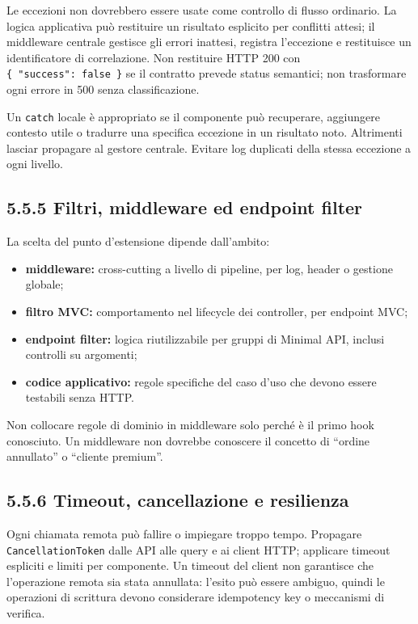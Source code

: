 \documentclass[
  italian,
  10pt,
]{book}
\providecommand{\tightlist}{%
  \setlength{\itemsep}{0pt}\setlength{\parskip}{0pt}}
\begin{document}
Le eccezioni non dovrebbero essere usate come controllo di flusso
ordinario. La logica applicativa può restituire un risultato esplicito
per conflitti attesi; il middleware centrale gestisce gli errori
inattesi, registra l'eccezione e restituisce un identificatore di
correlazione. Non restituire HTTP 200 con
\texttt{\{\ "success":\ false\ \}} se il contratto prevede status
semantici; non trasformare ogni errore in 500 senza classificazione.

Un \texttt{catch} locale è appropriato se il componente può recuperare,
aggiungere contesto utile o tradurre una specifica eccezione in un
risultato noto. Altrimenti lasciar propagare al gestore centrale.
Evitare log duplicati della stessa eccezione a ogni livello.

\subsection{5.5.5 Filtri, middleware ed endpoint
filter}\label{filtri-middleware-ed-endpoint-filter}

La scelta del punto d'estensione dipende dall'ambito:

\begin{itemize}
\tightlist
\item
  \textbf{middleware:} cross-cutting a livello di pipeline, per log,
  header o gestione globale;
\item
  \textbf{filtro MVC:} comportamento nel lifecycle dei controller, per
  endpoint MVC;
\item
  \textbf{endpoint filter:} logica riutilizzabile per gruppi di Minimal
  API, inclusi controlli su argomenti;
\item
  \textbf{codice applicativo:} regole specifiche del caso d'uso che
  devono essere testabili senza HTTP.
\end{itemize}

Non collocare regole di dominio in middleware solo perché è il primo
hook conosciuto. Un middleware non dovrebbe conoscere il concetto di
``ordine annullato'' o ``cliente premium''.

\subsection{5.5.6 Timeout, cancellazione e
resilienza}\label{timeout-cancellazione-e-resilienza}

Ogni chiamata remota può fallire o impiegare troppo tempo. Propagare
\texttt{CancellationToken} dalle API alle query e ai client HTTP;
applicare timeout espliciti e limiti per componente. Un timeout del
client non garantisce che l'operazione remota sia stata annullata:
l'esito può essere ambiguo, quindi le operazioni di scrittura devono
considerare idempotency key o meccanismi di verifica.
\end{document}
